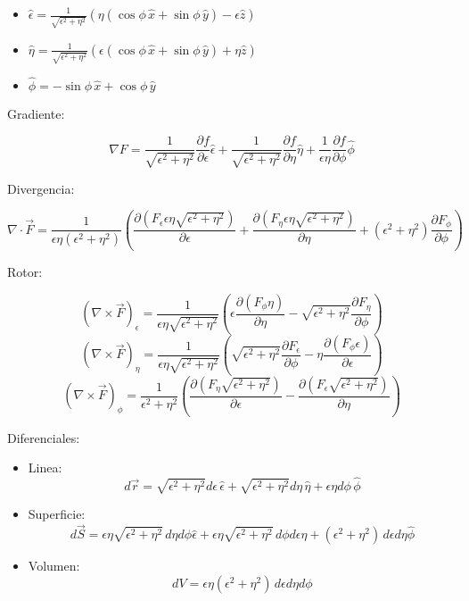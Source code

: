\begin{itemize}
    \item $\hat{\epsilon} = \frac{1}{\sqrt{\epsilon^2+\eta^2}}(\eta(\cos{\phi}\,\hat{x}+\sin{\phi}\,\hat{y})-\epsilon\hat{z})$
    \item $\hat{\eta} =  \frac{1}{\sqrt{\epsilon^2+\eta^2}}(\epsilon(\cos{\phi}\,\hat{x}+\sin{\phi}\,\hat{y})+\eta\hat{z})$
    \item $\hat{\phi} = -\sin{\phi}\,\hat{x}+\cos{\phi}\,\hat{y}$
\end{itemize}

\bigbreak

Gradiente:

\[\nabla F = \frac{1}{\sqrt{\epsilon^2+\eta^2}}\frac{\partial
 f}{\partial \epsilon}\hat{\epsilon}+\frac{1}{\sqrt{\epsilon^2+\eta^2}}\frac{\partial
 f}{\partial \eta}\hat{\eta}+\frac{1}{\epsilon\eta}\frac{\partial f}{\partial \phi}\hat{\phi}\]

Divergencia:

\[\nabla \cdot \vec{F} = \frac{1}{\epsilon\eta(\epsilon^2+\eta^2)}
\left(
\frac{\partial(F_\epsilon\epsilon\eta\sqrt{\epsilon^2+\eta^2})}{\partial\epsilon}+
\frac{\partial(F_\eta\epsilon\eta\sqrt{\epsilon^2+\eta^2})}{\partial\eta}+(\epsilon^2+\eta^2)
\frac{\partial F_\phi}{\partial\phi}\right)\]

Rotor:

\[\left(\nabla\times\vec{F}\right)_\epsilon =
\frac{1}{\epsilon\eta\sqrt{\epsilon^2+\eta^2}}
\left(\epsilon
\frac{\partial(F_\phi\eta)}{\partial\eta}-\sqrt{\epsilon^2+\eta^2}\frac{\partial F_\eta}{\partial\phi}\right)\]
\[\left(\nabla\times\vec{F}\right)_\eta=\frac{1}{\epsilon\eta\sqrt{\epsilon^2+\eta^2}}
\left(\sqrt{\epsilon^2+\eta^2}
\frac{\partial F_\epsilon}{\partial\phi}-\eta
\frac{\partial(F_\phi\epsilon)}{\partial\epsilon}\right)\]
\[\left(\nabla\times\vec{F}\right)_\phi=
\frac{1}{\epsilon^2+\eta^2}
\left(\frac{\partial(F_\eta\sqrt{\epsilon^2+\eta^2})}{\partial\epsilon}-\frac{\partial(F_\epsilon\sqrt{\epsilon^2+\eta^2})}{\partial\eta}\right)\]

Diferenciales:

\begin{itemize}
    \item Linea:
    \[d\vec{r} = \sqrt{\epsilon^2+\eta^2}d\epsilon\,\hat{\epsilon} + \sqrt{\epsilon^2+\eta^2}d\eta\,\hat{\eta}+\epsilon\eta d\phi\,\hat{\phi}\]
    \item Superficie:
    \[d\vec{S} = \epsilon\eta\sqrt{\epsilon^2+\eta^2}\,d\eta d\phi\hat{\epsilon}+\epsilon\eta\sqrt{\epsilon^2+\eta^2}\,d\phi d\epsilon\hat{\eta}+(\epsilon^2+\eta^2)\,d\epsilon d\eta\hat{\phi}\]
    \item Volumen:
    \[dV = \epsilon\eta(\epsilon^2+\eta^2)\,d\epsilon d\eta d\phi\]
\end{itemize}

